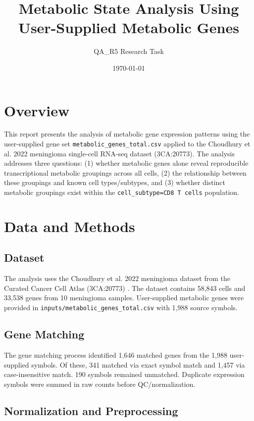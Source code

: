 \documentclass[11pt]{article}
\title{Metabolic State Analysis Using User-Supplied Metabolic Genes}
\author{QA\_R5 Research Task}
\date{\today}
\begin{document}
\maketitle

\section{Overview}

This report presents the analysis of metabolic gene expression patterns using the user-supplied gene set \texttt{metabolic\_genes\_total.csv} applied to the Choudhury et al. 2022 meningioma single-cell RNA-seq dataset (3CA:20773). The analysis addresses three questions: (1) whether metabolic genes alone reveal reproducible transcriptional metabolic groupings across all cells, (2) the relationship between these groupings and known cell types/subtypes, and (3) whether distinct metabolic groupings exist within the \texttt{cell\_subtype=CD8 T cells} population.

\section{Data and Methods}

\subsection{Dataset}

The analysis uses the Choudhury et al. 2022 meningioma dataset from the Curated Cancer Cell Atlas (3CA:20773) \cite{choudhury_2022}. The dataset contains 58,843 cells and 33,538 genes from 10 meningioma samples. User-supplied metabolic genes were provided in \texttt{inputs/metabolic\_genes\_total.csv} with 1,988 source symbols.

\subsection{Gene Matching}

The gene matching process identified 1,646 matched genes from the 1,988 user-supplied symbols. Of these, 341 matched via exact symbol match and 1,457 via case-insensitive match. 190 symbols remained unmatched. Duplicate expression symbols were summed in raw counts before QC/normalization.

\subsection{Normalization and Preprocessing}
\end{document}
